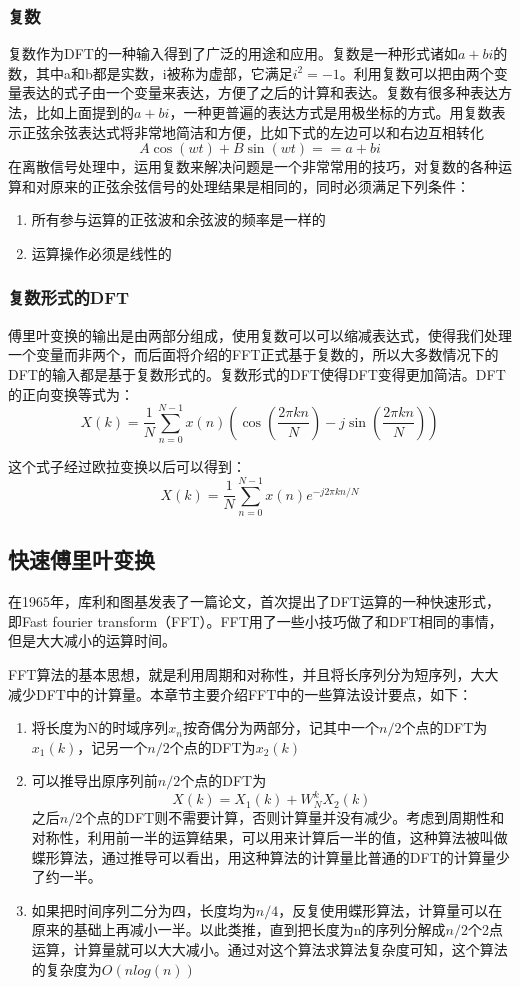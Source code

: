 \subsubsection{复数}
复数作为DFT的一种输入得到了广泛的用途和应用。复数是一种形式诸如$a+bi$的数，其中a和b都是实数，i被称为虚部，它满足$i^2=-1$。利用复数可以把由两个变量表达的式子由一个变量来表达，方便了之后的计算和表达。复数有很多种表达方法，比如上面提到的$a+bi$，一种更普遍的表达方式是用极坐标的方式。用复数表示正弦余弦表达式将非常地简洁和方便，比如下式的左边可以和右边互相转化$$A\cos (wt) + B\sin (wt) == a + bi$$在离散信号处理中，运用复数来解决问题是一个非常常用的技巧，对复数的各种运算和对原来的正弦余弦信号的处理结果是相同的，同时必须满足下列条件：

\begin{enumerate}
\item 所有参与运算的正弦波和余弦波的频率是一样的
\item 运算操作必须是线性的
\end{enumerate}

\subsubsection{复数形式的DFT}
傅里叶变换的输出是由两部分组成，使用复数可以可以缩减表达式，使得我们处理一个变量而非两个，而后面将介绍的FFT正式基于复数的，所以大多数情况下的DFT的输入都是基于复数形式的。复数形式的DFT使得DFT变得更加简洁。DFT的正向变换等式为：$$X(k)=\frac{1}{N}\sum_{n=0}^{N-1}x(n)(\cos(\frac{2\pi kn}{N}) - j\sin(\frac{2\pi kn}{N}))$$

这个式子经过欧拉变换以后可以得到：$$X(k)=\frac{1}{N}\sum_{n=0}^{N-1}x(n)e^{-j2\pi kn/N}$$

\subsection{快速傅里叶变换}
\label{sec:FFT}

在1965年，库利和图基发表了一篇论文，首次提出了DFT运算的一种快速形式，即Fast fourier transform（FFT）。FFT用了一些小技巧做了和DFT相同的事情，但是大大减小的运算时间。

FFT算法的基本思想，就是利用周期和对称性，并且将长序列分为短序列，大大减少DFT中的计算量。本章节主要介绍FFT中的一些算法设计要点，如下：

\begin{enumerate}
\item 将长度为N的时域序列$x_n$按奇偶分为两部分，记其中一个$n/2$个点的DFT为$x_1(k)$，记另一个$n/2$个点的DFT为$x_2(k)$
\item 可以推导出原序列前$n/2$个点的DFT为$$X(k)=X_1(k)+W^k_NX_2(k)$$之后$n/2$个点的DFT则不需要计算，否则计算量并没有减少。考虑到周期性和对称性，利用前一半的运算结果，可以用来计算后一半的值，这种算法被叫做蝶形算法，通过推导可以看出，用这种算法的计算量比普通的DFT的计算量少了约一半。
\item 如果把时间序列二分为四，长度均为$n/4$，反复使用蝶形算法，计算量可以在原来的基础上再减小一半。以此类推，直到把长度为n的序列分解成$n/2$个2点运算，计算量就可以大大减小。通过对这个算法求算法复杂度可知，这个算法的复杂度为$O(nlog(n))$
\end{enumerate}


